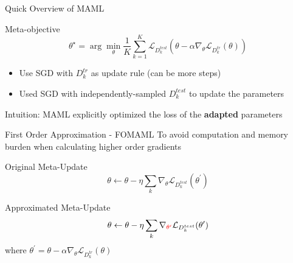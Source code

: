\documentclass{beamer}
\begin{document}
\begin{frame}[t]{Quick Overview of MAML}
  \begin{block}{Meta-objective}
    \begin{equation*}
    \theta^\star = \arg \min_\theta \frac{1}{K}\sum_{k=1}^{K}\mathcal{L}_{D_k^{test}}(\theta - \alpha \nabla_\theta \mathcal{L}_{D_k^{tr}}(\theta))
    \end{equation*}
  \end{block}

  \begin{itemize}
    \item Use SGD with $D_k^{tr}$ as update rule (can be more steps)
    \item Used SGD with independently-sampled $D_k^{test}$ to update the parameters
  \end{itemize}

  \vspace{1em}

  Intuition: MAML explicitly optimized the loss of the \textbf{adapted} parameters
\end{frame}

\begin{frame}[t]{First Order Approximation - FOMAML}
  To avoid computation and memory burden when calculating higher order gradients
  \begin{block}{Original Meta-Update}
    \begin{equation*}
      \theta \leftarrow \theta - \eta \sum_k \nabla_\theta \mathcal{L}_{D^{test}_k}(\theta^\prime)
    \end{equation*}
  \end{block}
  \begin{block}{Approximated Meta-Update}
    \begin{equation*}
      \theta \leftarrow \theta - \eta \sum_k \nabla_{\textcolor{red}{\theta^\prime}} \mathcal{L}_{D^{test}_k}(\theta^\prime)
    \end{equation*}
    \center where $\theta^\prime = \theta - \alpha \nabla_\theta \mathcal{L}_{D^{tr}_k} (\theta)$
  \end{block}
\end{frame}
\end{document}
